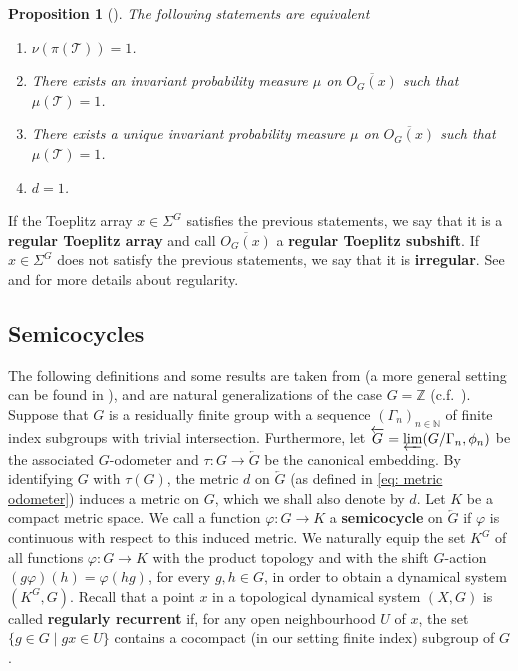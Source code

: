 \documentclass[titlepage,reqno,10pt]{amsart}
\newtheorem{proposition}[theorem]{Proposition}
\theoremstyle{definition}
\def\Z{{\mathbb Z}}
\def\N{{\mathbb N}}
\begin{document}
\begin{proposition}[{\cite[Proposition 3.3]{CeCoGo23}}] \label{prop: regular Toeplitz flows}
    The following statements are equivalent
    \begin{enumerate}
        \item $\nu(\pi(\mathcal{T}))=1$.
        \item There exists an invariant probability measure $\mu$ on $\overline{O_G(x)}$ such that \mbox{$\mu(\mathcal{T})=1$.}
        \item There exists a unique invariant probability measure $\mu$ on $\overline{O_G(x)}$ such that $\mu(\mathcal{T})=1$.
        \item $d=1$.
    \end{enumerate}
\end{proposition}
If the Toeplitz array $x\in\Sigma^G$ satisfies the previous statements, we say that it is a \textbf{regular Toeplitz array} and call $\overline{O_G(x)}$ a \textbf{regular Toeplitz subshift}.
If $x\in\Sigma^G$ does not satisfy the previous statements, we say that it is \textbf{irregular}.
See \cite{FK18} and \cite{LaStra18}  for more details about regularity.

\subsection{Semicocycles} \label{sec: semicocycles}  

The following definitions and some results are taken from \cite{CoPe08}  (a more general setting can be found in \cite{FK18}),  and are natural generalizations of the case $G=\Z$ (c.f.\ \cite{Do05}).
Suppose that $G$ is a residually finite group with a sequence $(\Gamma_n)_{n\in\N}$ of finite index subgroups with trivial intersection.
Furthermore, let $\overleftarrow{G} = \varprojlim(G/\Gamma_n,\phi_n)$ be the associated $G$-odometer and $\tau: G \to \overleftarrow{G}$ be the canonical embedding.
By identifying $G$ with $\tau(G)$, the metric $d$ on $\overleftarrow{G}$ (as defined in \eqref{eq: metric odometer}) induces a metric on $G$, which we shall also denote by $d$.
Let $K$ be a compact metric space.
We call a function $\varphi: G \to K$ a {\bf semicocycle} on $\overleftarrow{G}$ if $\varphi$ is continuous with respect to this induced metric.
We naturally equip the set $K^G$ of all functions $\varphi: G \to K$ with the product topology and with the shift $G$-action $(g\varphi)(h) = \varphi(hg)$, for every $g,h\in G$, in order to obtain a dynamical system $(K^G,G)$. 
Recall that a point $x$ in a topological dynamical system $(X,G)$ is called \textbf{regularly recurrent} if, for any open neighbourhood $U$ of $x$, the set $\{g\in G\mid gx\in U\}$ contains a cocompact (in our setting finite index) subgroup of $G$. 
\end{document}
